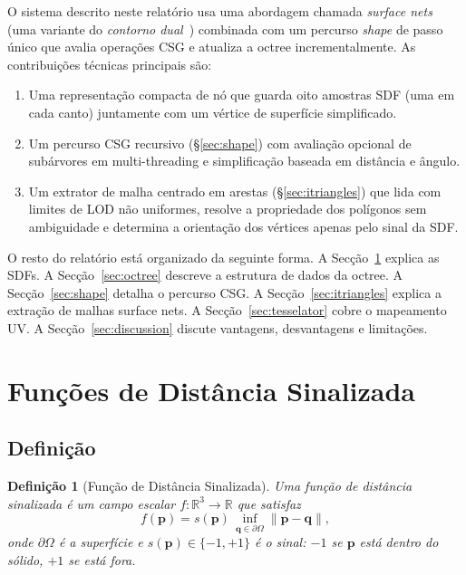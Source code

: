 \documentclass[10pt,a4paper]{article}
\newtheorem{definition}{Definição}
\begin{document}
O sistema descrito neste relatório usa uma abordagem chamada
\emph{surface nets} (uma variante do \emph{contorno
dual}~\cite{ju02}) combinada com um percurso \emph{shape} de passo
único que avalia operações CSG e atualiza a octree incrementalmente.
As contribuições técnicas principais são:
\begin{enumerate}
  \item Uma representação compacta de nó que guarda oito amostras SDF
    (uma em cada canto) juntamente com um vértice de superfície
    simplificado.
  \item Um percurso CSG recursivo (\S\ref{sec:shape}) com avaliação
    opcional de subárvores em multi-threading e simplificação baseada
    em distância e ângulo.
  \item Um extrator de malha centrado em arestas (\S\ref{sec:itriangles})
    que lida com limites de LOD não uniformes, resolve a propriedade
    dos polígonos sem ambiguidade e determina a orientação dos
    vértices apenas pelo sinal da SDF.
\end{enumerate}

\bigskip\noindent
O resto do relatório está organizado da seguinte forma.
A Secção~\ref{sec:sdf} explica as SDFs.
A Secção~\ref{sec:octree} descreve a estrutura de dados da octree.
A Secção~\ref{sec:shape} detalha o percurso CSG.
A Secção~\ref{sec:itriangles} explica a extração de malhas surface nets.
A Secção~\ref{sec:tesselator} cobre o mapeamento UV.
A Secção~\ref{sec:discussion} discute vantagens, desvantagens e limitações.

\section{Funções de Distância Sinalizada}
\label{sec:sdf}

\subsection{Definição}

\begin{definition}[Função de Distância Sinalizada]
Uma \emph{função de distância sinalizada} é um campo escalar
$f:\mathbb{R}^3\to\mathbb{R}$ que satisfaz
\[
  f(\mathbf{p}) = s(\mathbf{p})\,\inf_{\mathbf{q}\in\partial\Omega}
    \|\mathbf{p}-\mathbf{q}\|,
\]
onde $\partial\Omega$ é a superfície e $s(\mathbf{p})\in\{-1,+1\}$
é o sinal: $-1$ se $\mathbf{p}$ está dentro do sólido, $+1$ se está
fora.
\end{definition}
\end{document}
